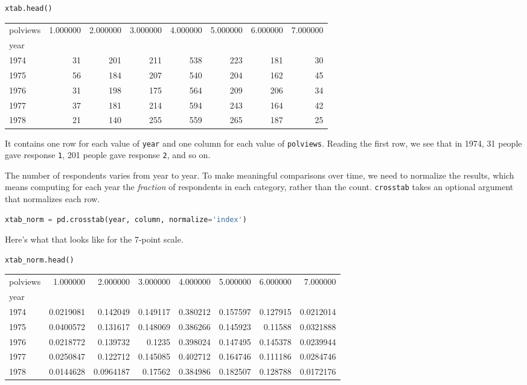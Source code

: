 \begin{lstlisting}[language=Python,style=source]
xtab.head()
\end{lstlisting}

\begin{tabular}{lrrrrrrr}
\midrule
polviews & 1.000000 & 2.000000 & 3.000000 & 4.000000 & 5.000000 & 6.000000 & 7.000000 \\
year &  &  &  &  &  &  &  \\
\midrule
1974 & 31 & 201 & 211 & 538 & 223 & 181 & 30 \\
1975 & 56 & 184 & 207 & 540 & 204 & 162 & 45 \\
1976 & 31 & 198 & 175 & 564 & 209 & 206 & 34 \\
1977 & 37 & 181 & 214 & 594 & 243 & 164 & 42 \\
1978 & 21 & 140 & 255 & 559 & 265 & 187 & 25 \\
\midrule
\end{tabular}

It contains one row for each value of \passthrough{\lstinline!year!} and
one column for each value of \passthrough{\lstinline!polviews!}. Reading
the first row, we see that in 1974, 31 people gave response
\passthrough{\lstinline!1!}, 201 people gave response
\passthrough{\lstinline!2!}, and so on.

The number of respondents varies from year to year. To make meaningful
comparisons over time, we need to normalize the results, which means
computing for each year the \emph{fraction} of respondents in each
category, rather than the count. \passthrough{\lstinline!crosstab!}
takes an optional argument that normalizes each row.

\begin{lstlisting}[language=Python,style=source]
xtab_norm = pd.crosstab(year, column, normalize='index')
\end{lstlisting}

Here's what that looks like for the 7-point scale.

\begin{lstlisting}[language=Python,style=source]
xtab_norm.head()
\end{lstlisting}

\begin{tabular}{lrrrrrrr}
\midrule
polviews & 1.000000 & 2.000000 & 3.000000 & 4.000000 & 5.000000 & 6.000000 & 7.000000 \\
year &  &  &  &  &  &  &  \\
\midrule
1974 & 0.0219081 & 0.142049 & 0.149117 & 0.380212 & 0.157597 & 0.127915 & 0.0212014 \\
1975 & 0.0400572 & 0.131617 & 0.148069 & 0.386266 & 0.145923 & 0.11588 & 0.0321888 \\
1976 & 0.0218772 & 0.139732 & 0.1235 & 0.398024 & 0.147495 & 0.145378 & 0.0239944 \\
1977 & 0.0250847 & 0.122712 & 0.145085 & 0.402712 & 0.164746 & 0.111186 & 0.0284746 \\
1978 & 0.0144628 & 0.0964187 & 0.17562 & 0.384986 & 0.182507 & 0.128788 & 0.0172176 \\
\midrule
\end{tabular}

